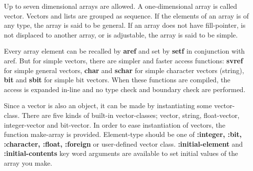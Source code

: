 Up to seven dimensional arrays are allowed.
A one-dimensional array is called vector.
Vectors and lists are grouped as sequence.
If the elements of an array is of any type, the array is said to be general.
If an array does not have fill-pointer, is not displaced to
another array, or is adjustable, the array is said to be simple.

Every array element can be recalled by {\bf aref} and set by {\bf setf} in
conjunction with aref.
But for simple vectors, there are simpler and faster access functions:
{\bf svref} for simple general vectors, {\bf char} and {\bf schar} for
simple character vectors (string), {\bf bit} and {\bf sbit} for
simple bit vectors.  When these functions are compiled,
the access is expanded in-line and no type check and boundary check are 
performed.

Since a vector is also an object,
it can be made by instantiating some vector-class.
There are five kinds of built-in vector-classes;
vector, string, float-vector, integer-vector and bit-vector.
In order to ease instantiation of vectors, the function make-array
is provided.
Element-type should be one of {\bf :integer, :bit, :character, :float, :foreign}
or user-defined vector class.
{\bf :initial-element} and {\bf :initial-contents} key word arguments are
available to set initial values of the array you make.

